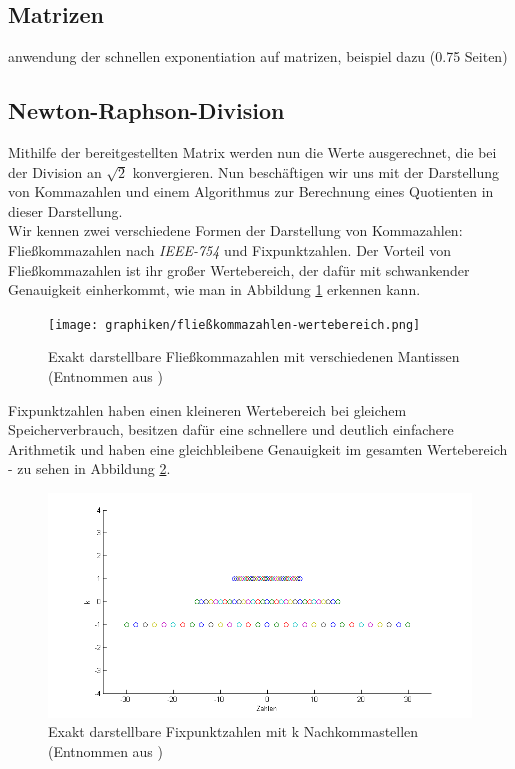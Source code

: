 \documentclass[course=erap]{aspdoc}
\begin{document}
\subsection{Matrizen} \label{sec:matrizen}
anwendung der schnellen exponentiation auf matrizen, beispiel dazu
(0.75 Seiten)

\newpage
\subsection{Newton-Raphson-Division} \label{sec:newton-raphson}
Mithilfe der bereitgestellten Matrix werden nun die Werte ausgerechnet, die bei der Division an $\sqrt{2}$ konvergieren.
Nun beschäftigen wir uns mit der Darstellung von Kommazahlen und einem Algorithmus zur Berechnung eines Quotienten in dieser Darstellung. \\
Wir kennen zwei verschiedene Formen der Darstellung von Kommazahlen: Fließkommazahlen nach \textit{IEEE-754} und Fixpunktzahlen.
Der Vorteil von Fließkommazahlen ist ihr großer Wertebereich, der dafür mit schwankender Genauigkeit einherkommt, wie man in Abbildung \ref{img:fließkommazahlen-wertebereich} erkennen kann.

\begin{figure}[h] \centering
  \texttt{[image: graphiken/fließkommazahlen-wertebereich.png]} 
  \caption{Exakt darstellbare Fließkommazahlen mit verschiedenen Mantissen (Entnommen aus \cite{fliesskommazahlen})} \label{img:fließkommazahlen-wertebereich}
\end{figure} 

Fixpunktzahlen haben einen kleineren Wertebereich bei gleichem Speicherverbrauch, besitzen dafür eine schnellere und deutlich einfachere Arithmetik und haben eine gleichbleibene Genauigkeit im gesamten Wertebereich - zu sehen in Abbildung \ref{img:fixpunktzahlen-wertebereich}.

\begin{figure}[h] \centering
  \includegraphics[scale=0.4]{graphiken/fixpunktzahlen-wertebereich.png} 
  \caption{Exakt darstellbare Fixpunktzahlen mit k Nachkommastellen (Entnommen aus \cite{fixpunktzahlen})} \label{img:fixpunktzahlen-wertebereich}
\end{figure} 
\end{document}
